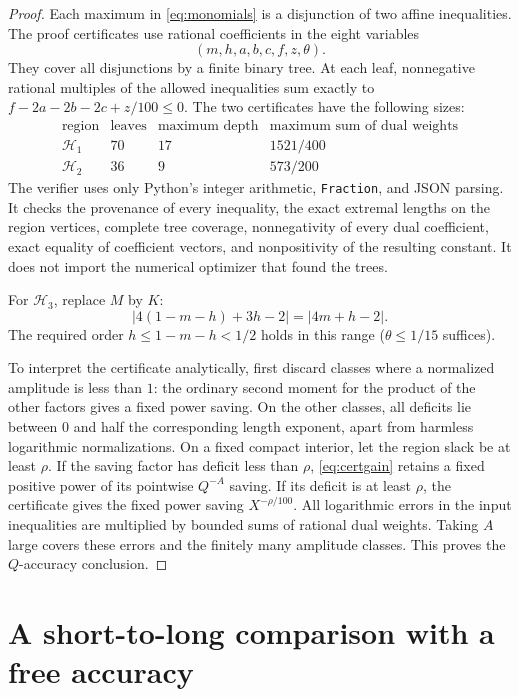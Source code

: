 \begin{proof}
Each maximum in \eqref{eq:monomials} is a disjunction of two affine
inequalities. The proof certificates use rational coefficients in
the eight variables
\[
                  (m,h,a,b,c,f,z,\theta).
\]
They cover all disjunctions by a finite binary tree.
At each leaf, nonnegative rational multiples of the allowed
inequalities sum exactly to
$f-2a-2b-2c+z/100\le0$.
The two certificates have the following sizes:
\[
\begin{array}{c|r|r|c}
 \text{region}&\text{leaves}&\text{maximum depth}
      &\text{maximum sum of dual weights}\\ \hline
 \mathcal H_1&70&17&1521/400\\
 \mathcal H_2&36&9&573/200
\end{array}
\]
The verifier uses only Python's integer arithmetic, \texttt{Fraction},
and JSON parsing.
It checks the provenance of every inequality, the exact extremal
lengths on the region vertices, complete tree coverage, nonnegativity
of every dual coefficient, exact equality of coefficient vectors,
and nonpositivity of the resulting constant.
It does not import the numerical optimizer that found the trees.

For $\mathcal H_3$, replace $M$ by $K$:
\[
 |4(1-m-h)+3h-2|=|4m+h-2|.
\]
The required order $h\le1-m-h<1/2$ holds in this range
($\theta\le1/15$ suffices).

To interpret the certificate analytically, first discard classes
where a normalized amplitude is less than $1$:
the ordinary second moment for the product of the other factors
gives a fixed power saving.
On the other classes, all deficits lie between $0$ and half the
corresponding length exponent, apart from harmless logarithmic
normalizations.
On a fixed compact interior, let the region slack be at least $\rho$.
If the saving factor has deficit less than $\rho$,
\eqref{eq:certgain} retains a fixed positive power of its pointwise
$Q^{-A}$ saving.
If its deficit is at least $\rho$, the certificate gives the fixed
power saving $X^{-\rho/100}$.
All logarithmic errors in the input inequalities are multiplied
by bounded sums of rational dual weights.
Taking $A$ large covers these errors and the finitely many amplitude
classes. This proves the $Q$-accuracy conclusion.
\end{proof}

\section{A short-to-long comparison with a free accuracy}\label{sec:comparison}

